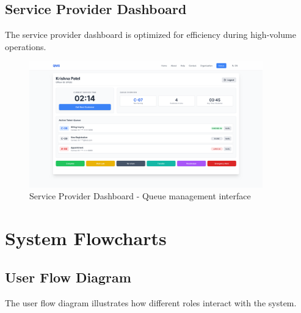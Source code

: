 \documentclass[12pt,a4paper]{report}
\begin{document}
\subsection{Service Provider Dashboard}

The service provider dashboard is optimized for efficiency during high-volume operations.

\begin{figure}[h]
    \centering
    \includegraphics[width=0.9\textwidth]{screenshot(2).png}
    \caption{Service Provider Dashboard - Queue management interface}
    \label{fig:provider_dashboard}
\end{figure}

\newpage
\section{System Flowcharts}

\subsection{User Flow Diagram}

The user flow diagram illustrates how different roles interact with the system.
\end{document}
